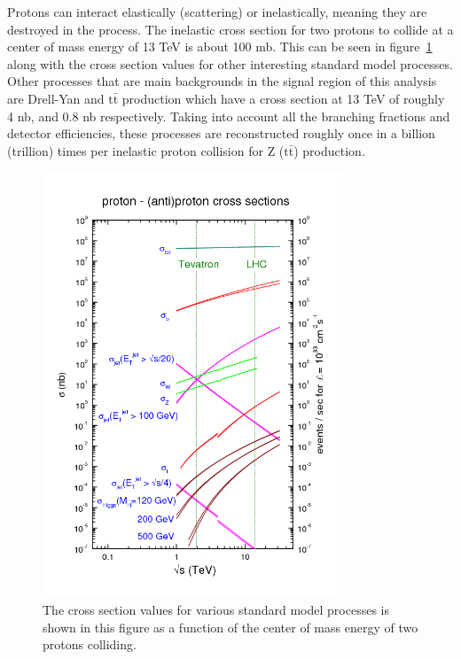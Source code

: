 Protons can interact elastically (scattering) or inelastically, meaning they are destroyed in the process.
The inelastic cross section for two protons to collide at a center of mass energy of 13 TeV is about 100 mb.
This can be seen in figure~\ref{fig:xsecs} along with the cross section values for other interesting
standard model processes.
Other processes that are main backgrounds in the signal region of this analysis are Drell-Yan and $\mathrm{t\bar{t}}$ production
which have a cross section at 13 TeV of roughly 4 nb, and 0.8 nb respectively.
Taking into account all the branching fractions and detector efficiencies,
these processes are reconstructed roughly once in a billion (trillion) times per inelastic proton collision for Z ($\mathrm{t\bar{t}}$) production.

\begin{figure}[!ht]
  \begin{center}
    \includegraphics[width=0.8\textwidth]{cms/figs/cross-sections.png}
    \caption{
      The cross section values for various standard model processes is shown in this figure as a
      function of the center of mass energy of two protons colliding.
      \label{fig:xsecs}
    }
  \end{center}
\end{figure}

